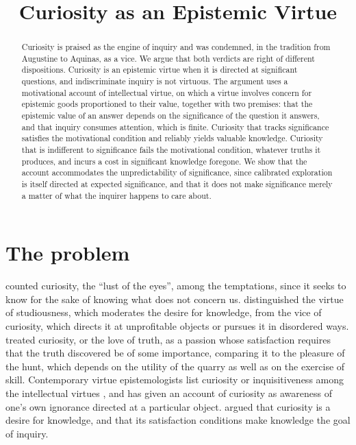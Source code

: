 \documentclass{situationist-preprint}
\title{Curiosity as an Epistemic Virtue}
\begin{document}
\maketitle

\begin{abstract}
Curiosity is praised as the engine of inquiry and was condemned, in the tradition from Augustine to Aquinas, as a vice. We argue that both verdicts are right of different dispositions. Curiosity is an epistemic virtue when it is directed at significant questions, and indiscriminate inquiry is not virtuous. The argument uses a motivational account of intellectual virtue, on which a virtue involves concern for epistemic goods proportioned to their value, together with two premises: that the epistemic value of an answer depends on the significance of the question it answers, and that inquiry consumes attention, which is finite. Curiosity that tracks significance satisfies the motivational condition and reliably yields valuable knowledge. Curiosity that is indifferent to significance fails the motivational condition, whatever truths it produces, and incurs a cost in significant knowledge foregone. We show that the account accommodates the unpredictability of significance, since calibrated exploration is itself directed at expected significance, and that it does not make significance merely a matter of what the inquirer happens to care about.
\end{abstract}

\section{The problem}

\citet[X.35]{Augustine} counted curiosity, the \enquote{lust of the eyes}, among the temptations, since it seeks to know for the sake of knowing what does not concern us. \citet[II-II, q.~166--167]{Aquinas} distinguished the virtue of studiousness, which moderates the desire for knowledge, from the vice of curiosity, which directs it at unprofitable objects or pursues it in disordered ways. \citet[2.3.10]{Hume} treated curiosity, or the love of truth, as a passion whose satisfaction requires that the truth discovered be of some importance, comparing it to the pleasure of the hunt, which depends on the utility of the quarry as well as on the exercise of skill. Contemporary virtue epistemologists list curiosity or inquisitiveness among the intellectual virtues \citep{Zagzebski1996,Baehr2011}, and \citet{Inan2012} has given an account of curiosity as awareness of one's own ignorance directed at a particular object. \citet{Whitcomb2010} argued that curiosity is a desire for knowledge, and that its satisfaction conditions make knowledge the goal of inquiry.
\end{document}
